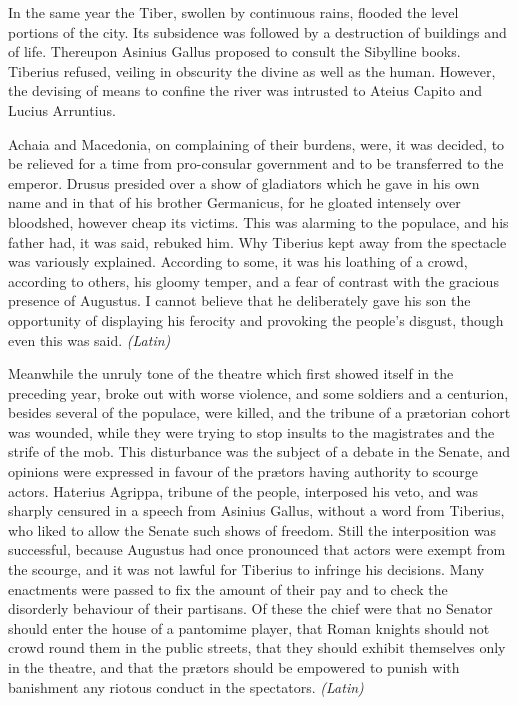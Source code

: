 
In the same year the Tiber, swollen by continuous rains, flooded the level portions of the city. Its subsidence was followed by a destruction of buildings and of life. Thereupon Asinius Gallus proposed to consult the Sibylline books. Tiberius refused, veiling in obscurity the divine as well as the human. However, the devising of means to confine the river was intrusted to Ateius Capito and Lucius Arruntius.

Achaia and Macedonia, on complaining of their burdens, were, it was decided, to be relieved for a time from pro-consular government and to be transferred to the emperor. Drusus presided over a show of gladiators which he gave in his own name and in that of his brother Germanicus, for he gloated intensely over bloodshed, however cheap its victims. This was alarming to the populace, and his father had, it was said, rebuked him. Why Tiberius kept away from the spectacle was variously explained. According to some, it was his loathing of a crowd, according to others, his gloomy temper, and a fear of contrast with the gracious presence of Augustus. I cannot believe that he deliberately gave his son the opportunity of displaying his ferocity and provoking the people's disgust, though even this was said. \emph{(Latin)}


Meanwhile the unruly tone of the theatre which first showed itself in the preceding year, broke out with worse violence, and some soldiers and a centurion, besides several of the populace, were killed, and the tribune of a prætorian cohort was wounded, while they were trying to stop insults to the magistrates and the strife of the mob. This disturbance was the subject of a debate in the Senate, and opinions were expressed in favour of the prætors having authority to scourge actors. Haterius Agrippa, tribune of the people, interposed his veto, and was sharply censured in a speech from Asinius Gallus, without a word from Tiberius, who liked to allow the Senate such shows of freedom. Still the interposition was successful, because Augustus had once pronounced that actors were exempt from the scourge, and it was not lawful for Tiberius to infringe his decisions. Many enactments were passed to fix the amount of their pay and to check the disorderly behaviour of their partisans. Of these the chief were that no Senator should enter the house of a pantomime player, that Roman knights should not crowd round them in the public streets, that they should exhibit themselves only in the theatre, and that the prætors should be empowered to punish with banishment any riotous conduct in the spectators. \emph{(Latin)}

